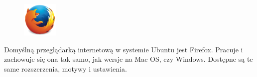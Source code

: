 \begin{figure}
	\vspace{-10pt}
	\includegraphics[width=\linewidth]{images/ikony_firefox.png}
\end{figure}

Domyślną przeglądarką internetową w systemie Ubuntu jest Firefox. Pracuje i zachowuje się ona tak samo, jak wersje na Mac OS, czy Windows. Dostępne są te same rozszerzenia, motywy i ustawienia.

